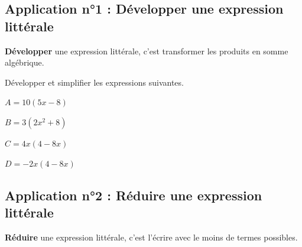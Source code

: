 \documentclass[a4paper]{book}
\begin{document}
\subsection{Application n°1 : Développer une expression littérale}
    \begin{definition}[Développer]
        \textbf{Développer} une expression littérale, c'est transformer les produits en somme algébrique.
    \end{definition}
    

    \begin{exemple}
        Développer et simplifier les expressions suivantes.

        \medskip

        \begin{minipage}{0.24\linewidth}
            $A=10(5x-8)$

            \vspace{2cm}
        \end{minipage}
        \hfill\vline\hfill
        \begin{minipage}{0.24\linewidth}
            $B=3(2x^2+8)$

            \vspace{2cm}
        \end{minipage}
        \hfill\vline\hfill
        \begin{minipage}{0.24\linewidth}
            $C=4x(4-8x)$

            \vspace{2cm}
        \end{minipage}
        \hfill\vline\hfill
        \begin{minipage}{0.24\linewidth}
            $D=-2x(4-8x)$

            \vspace{2cm}
        \end{minipage}
    \end{exemple}


\newpage


\subsection{Application n°2 : Réduire une expression littérale}
    \begin{definition}[Réduire]
        \textbf{Réduire} une expression littérale, c'est l'écrire avec le moins de termes possibles.
    \end{definition}
\end{document}

